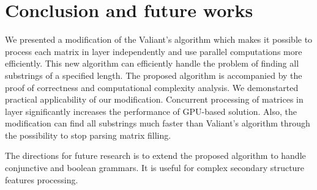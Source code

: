 \section{Conclusion and future works}

We presented a modification of the Valiant's algorithm which makes it possible to process each matrix in layer independently and use parallel computations more efficiently.
This new algorithm can efficiently handle the problem of finding all substrings of a specified length.
The proposed algorithm is accompanied by the proof of correctness and computational complexity analysis.
We demonstarted practical applicability of our modification. 
Concurrent processing of matrices in layer significantly increases the performance of GPU-based solution. 
Also, the modification can find all substrings much faster than Valiant's algorithm through the possibility to stop parsing matrix filling.

The directions for future research is to extend the proposed algorithm to handle conjunctive and boolean grammars.
It is useful for complex secondary structure features processing.